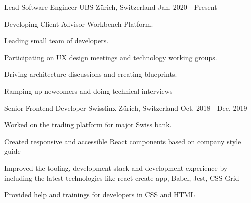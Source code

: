 

\begin{cventries}

  \cventry
    {Lead Software Engineer} %
    {UBS} %
    {Zürich, Switzerland} %
    {Jan. 2020 - Present} %
    {
      \begin{cvitems} %
        \item {Developing Client Advisor Workbench Platform.}
        \item {Leading small team of developers.}
        \item {Participating on UX design meetings and technology working groups.}
        \item {Driving architecture discussions and creating blueprints.}
        \item {Ramping-up newcomers and doing technical interviews}
      \end{cvitems}
    }

  \cventry
    {Senior Frontend Developer} %
    {Swisslinx} %
    {Zürich, Switzerland} %
    {Oct. 2018 - Dec. 2019} %
    {
      \begin{cvitems} %
        \item {Worked on the trading platform for major Swiss bank.}
        \item {Created responsive and accessible React components based on company style guide}
        \item {Improved the tooling, development stack and development experience by including the latest technologies like react-create-app, Babel, Jest, CSS Grid}
        \item {Provided help and trainings for developers in CSS and HTML}
      \end{cvitems}
    }


\end{cventries}
